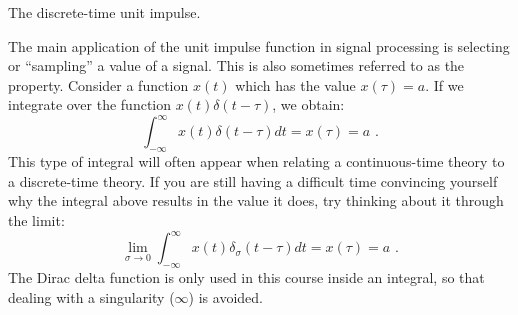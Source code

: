\begin{marginfigure}
\begin{center}
\end{center}
\caption{The discrete-time unit impulse.}
\label{fig:udensdisc}
\end{marginfigure}

The main application of the unit impulse function in signal processing is selecting or ``sampling'' a value of a signal. This is also sometimes referred to as the \emph{} property. Consider a function $x(t)$ which has the value $x(\tau) = a$. If we integrate over the function $x(t)\delta(t-\tau)$, we obtain:
\begin{equation}
\int_{-\infty}^{\infty}x(t)\delta(t-\tau) dt = x(\tau) = a\,\,.
\end{equation}
This type of integral will often appear when relating a continuous-time theory to a discrete-time theory. If you are still having a difficult time convincing yourself why the integral above results in the value it does, try thinking about it through the limit:
\begin{equation}
\lim_{\sigma\rightarrow 0}\int_{-\infty}^{\infty}x(t)\delta_{\sigma}(t-\tau) dt = x(\tau) = a\,\,.
\end{equation}
The Dirac delta function is only used in this course inside an integral, so that dealing with a singularity ($\infty$) is avoided.

